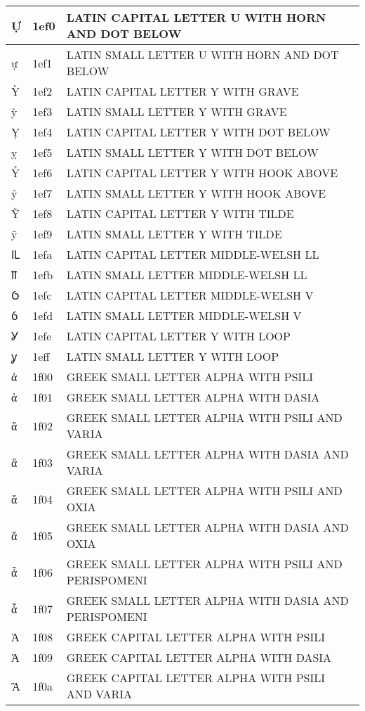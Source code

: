 \documentclass[12pt,letterpaper,openany]{book}
\begin{document}
\begin{center}
\begin{supertabular}{|m{0.25in}|m{0.5in}|m{4in}|}
Ự & 1ef0 & LATIN CAPITAL LETTER U WITH HORN AND DOT BELOW\\\hline
ự & 1ef1 & LATIN SMALL LETTER U WITH HORN AND DOT BELOW\\\hline
Ỳ & 1ef2 & LATIN CAPITAL LETTER Y WITH GRAVE\\\hline
ỳ & 1ef3 & LATIN SMALL LETTER Y WITH GRAVE\\\hline
Ỵ & 1ef4 & LATIN CAPITAL LETTER Y WITH DOT BELOW\\\hline
ỵ & 1ef5 & LATIN SMALL LETTER Y WITH DOT BELOW\\\hline
Ỷ & 1ef6 & LATIN CAPITAL LETTER Y WITH HOOK ABOVE\\\hline
ỷ & 1ef7 & LATIN SMALL LETTER Y WITH HOOK ABOVE\\\hline
Ỹ & 1ef8 & LATIN CAPITAL LETTER Y WITH TILDE\\\hline
ỹ & 1ef9 & LATIN SMALL LETTER Y WITH TILDE\\\hline
Ỻ & 1efa & LATIN CAPITAL LETTER MIDDLE-WELSH LL\\\hline
ỻ & 1efb & LATIN SMALL LETTER MIDDLE-WELSH LL\\\hline
Ỽ & 1efc & LATIN CAPITAL LETTER MIDDLE-WELSH V\\\hline
ỽ & 1efd & LATIN SMALL LETTER MIDDLE-WELSH V\\\hline
Ỿ & 1efe & LATIN CAPITAL LETTER Y WITH LOOP\\\hline
ỿ & 1eff & LATIN SMALL LETTER Y WITH LOOP\\\hline
ἀ & 1f00 & GREEK SMALL LETTER ALPHA WITH PSILI\\\hline
ἁ & 1f01 & GREEK SMALL LETTER ALPHA WITH DASIA\\\hline
ἂ & 1f02 & GREEK SMALL LETTER ALPHA WITH PSILI AND VARIA\\\hline
ἃ & 1f03 & GREEK SMALL LETTER ALPHA WITH DASIA AND VARIA\\\hline
ἄ & 1f04 & GREEK SMALL LETTER ALPHA WITH PSILI AND OXIA\\\hline
ἅ & 1f05 & GREEK SMALL LETTER ALPHA WITH DASIA AND OXIA\\\hline
ἆ & 1f06 & GREEK SMALL LETTER ALPHA WITH PSILI AND PERISPOMENI\\\hline
ἇ & 1f07 & GREEK SMALL LETTER ALPHA WITH DASIA AND PERISPOMENI\\\hline
Ἀ & 1f08 & GREEK CAPITAL LETTER ALPHA WITH PSILI\\\hline
Ἁ & 1f09 & GREEK CAPITAL LETTER ALPHA WITH DASIA\\\hline
Ἂ & 1f0a & GREEK CAPITAL LETTER ALPHA WITH PSILI AND VARIA\\\hline

\end{supertabular}
\end{center}
\end{document}
